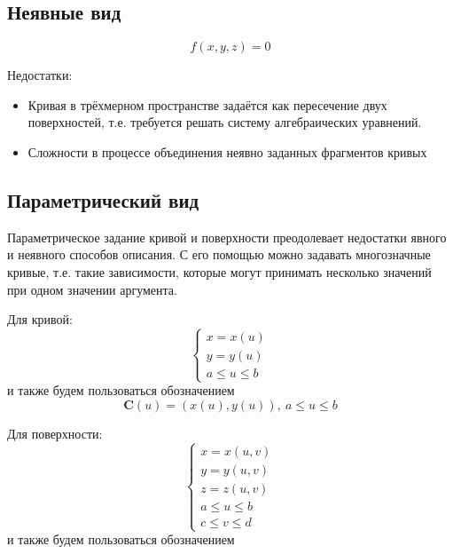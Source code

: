 \documentclass{bmstu}
\begin{document}
\subsection{Неявные вид}

\begin{equation*}
    f(x,y,z) = 0
\end{equation*}

Недостатки:
\begin{itemize}
    \item Кривая в трёхмерном пространстве задаётся как пересечение двух поверхностей, т.е. требуется решать систему алгебраических уравнений.
    \item Сложности в процессе объединения неявно заданных фрагментов кривых
\end{itemize}

\subsection{Параметрический вид}

Параметрическое  задание кривой и поверхности преодолевает недостатки явного и неявного способов описания. С его помощью можно задавать многозначные кривые, т.е. такие зависимости, которые могут принимать несколько значений при одном значении аргумента.

Для кривой:
\begin{equation}
    \begin{cases}
        x = x(u) \\
        y = y(u) \\
        a \le u \le b
    \end{cases}
\end{equation}
и также будем пользоваться обозначением
\begin{equation}
    \mathbf{C}(u) = (x(u), y(u)),~        a \le u \le b
\end{equation}

Для поверхности:
\begin{equation}
    \begin{cases}
        x = x(u, v)   \\
        y = y(u, v)   \\
        z = z(u, v)   \\
        a \le u \le b \\
        c \le v \le d
    \end{cases}
\end{equation}
и также будем пользоваться обозначением
\end{document}
